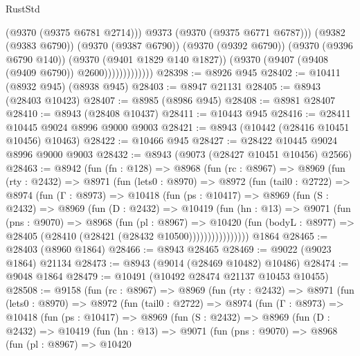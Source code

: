 \begin{lexlean}{RustStd}
\begin{coremodule}
                              (@9370 (@9375 @6781 @2714)))
                            @9373
                            (@9370 (@9375 @6771 @6787)))
                          (@9382 (@9383 @6790))
                          (@9370 (@9387 @6790))
                          (@9370 (@9392 @6790))
                          (@9370 (@9396 @6790 @140))
                          (@9370 (@9401 @1829 @140 @1827))
                          (@9370 (@9407 (@9408 (@9409 @6790)) @2600)))))))))))))
@28398 := @8926 @945
@28402 := @10411 (@8932 @945) (@8938 @945)
@28403 := @8947 @21131
@28405 := @8943 (@28403 @10423)
@28407 := @8985 (@8986 @945)
@28408 := @8981 @28407
@28410 := @8943 (@28408 @10437)
@28411 := @10443 @945
@28416 := @28411 @10445 @9024 @8996 @9000 @9003
@28421 := @8943 (@10442 (@28416 @10451 @10456) @10463)
@28422 := @10466 @945
@28427 := @28422 @10445 @9024 @8996 @9000 @9003
@28432 := @8943 (@9073 (@28427 @10451 @10456) @2566)
@28463 := @8942
    (fun (fn : @128) =>
    @8968
      (fun (rc : @8967) =>
      @8969
        (fun (rty : @2432) =>
        @8971
          (fun (lets0 : @8970) =>
          @8972
            (fun (tail0 : @2722) =>
            @8974
              (fun (Γ : @8973) =>
              @10418
                (fun (ps : @10417) =>
                @8969
                  (fun (S : @2432) =>
                  @8969
                    (fun (D : @2432) =>
                    @10419
                      (fun (hn : @13) =>
                      @9071
                        (fun (pns : @9070) =>
                        @8968
                          (fun (pl : @8967) =>
                          @10420
                            (fun (bodyL : @8977) =>
                            @28405 (@28410 (@28421 (@28432 @10500))))))))))))))))
    @1864
@28465 := @28403 (@8960 @1864)
@28466 := @8943 @28465
@28469 := @9022 (@9023 @1864) @21134
@28473 := @8943 (@9014 (@28469 @10482) @10486)
@28474 := @9048 @1864
@28479 := @10491 (@10492 @28474 @21137 @10453 @10455)
@28508 := @9158
    (fun (rc : @8967) =>
    @8969
      (fun (rty : @2432) =>
      @8971
        (fun (lets0 : @8970) =>
        @8972
          (fun (tail0 : @2722) =>
          @8974
            (fun (Γ : @8973) =>
            @10418
              (fun (ps : @10417) =>
              @8969
                (fun (S : @2432) =>
                @8969
                  (fun (D : @2432) =>
                  @10419
                    (fun (hn : @13) =>
                    @9071
                      (fun (pns : @9070) =>
                      @8968
                        (fun (pl : @8967) =>
                        @10420

\end{coremodule}
\end{lexlean}
